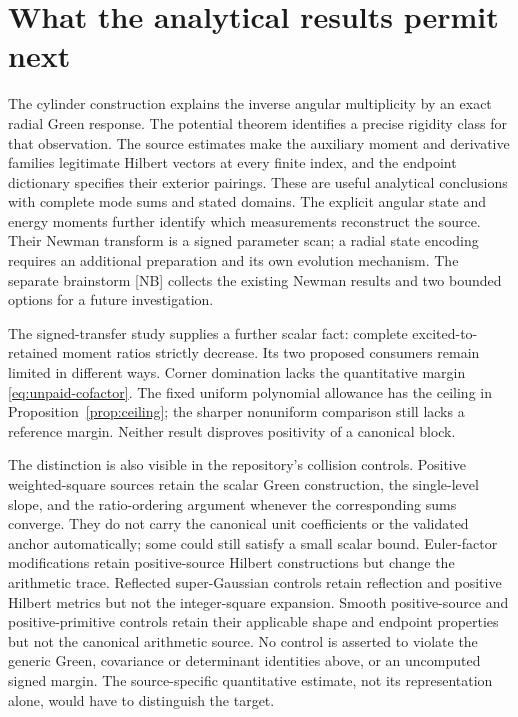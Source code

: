 \documentclass[11pt,letterpaper]{article}
\numberwithin{equation}{section}
\theoremstyle{remark}
\newcommand{\evid}[1]{\textsf{[#1]}}
\begin{document}
\section{What the analytical results permit next}
\label{sec:outlook}

The cylinder construction explains the inverse angular
multiplicity by an exact radial Green response. The potential
theorem identifies a precise rigidity class for that observation.
The source estimates make the auxiliary moment and derivative
families legitimate Hilbert vectors at every finite index, and
the endpoint dictionary specifies their exterior pairings.
These are useful analytical conclusions with complete mode sums
and stated domains. The explicit angular state and energy moments
further identify which measurements reconstruct the source. Their
Newman transform is a signed parameter scan; a radial state encoding
requires an additional preparation and its own evolution mechanism.
The separate brainstorm \evid{NB} collects the existing Newman results
and two bounded options for a future investigation.

The signed-transfer study supplies a further scalar fact:
complete excited-to-retained moment ratios strictly decrease.
Its two proposed consumers remain limited in different ways.
Corner domination lacks the quantitative margin
\eqref{eq:unpaid-cofactor}. The fixed uniform polynomial allowance
has the ceiling in Proposition~\ref{prop:ceiling}; the sharper
nonuniform comparison still lacks a reference margin.
Neither result disproves positivity of a canonical block.

The distinction is also visible in the repository's collision
controls. Positive weighted-square sources retain the scalar Green
construction, the single-level slope, and the ratio-ordering
argument whenever the corresponding sums converge.
They do not carry the canonical unit coefficients or the validated
anchor automatically; some could still satisfy a small scalar bound.
Euler-factor modifications retain positive-source Hilbert
constructions but change the arithmetic trace. Reflected
super-Gaussian controls retain reflection and positive Hilbert
metrics but not the integer-square expansion. Smooth positive-source
and positive-primitive controls retain their applicable shape and
endpoint properties but not the canonical arithmetic source.
No control is asserted to violate the generic Green, covariance
or determinant identities above, or an uncomputed signed margin.
The source-specific quantitative estimate, not its representation
alone, would have to distinguish the target.
\end{document}
